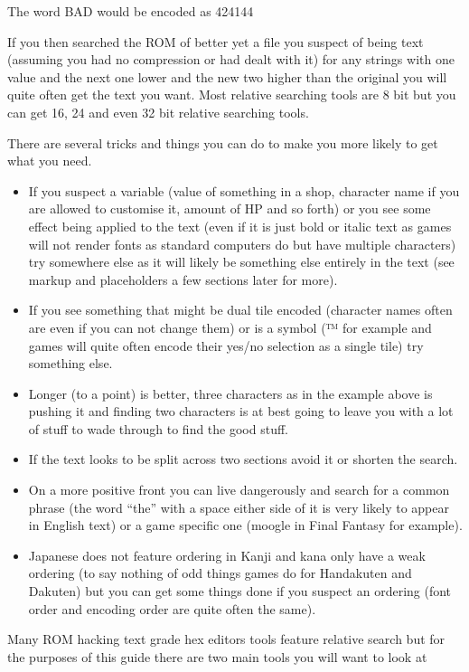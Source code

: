 \documentclass[
]{book}
\providecommand{\tightlist}{%
  \setlength{\itemsep}{0pt}\setlength{\parskip}{0pt}}
\begin{document}
The word BAD would be encoded as 424144

If you then searched the ROM of better yet a file you suspect of being text (assuming you had no compression or had dealt with it) for any strings with one value and the next one lower and the new two higher than the original you will quite often get the text you want. Most relative searching tools are 8 bit but you can get 16, 24 and even 32 bit relative searching tools.

There are several tricks and things you can do to make you more likely to get what you need.

\begin{itemize}
\tightlist
\item
  If you suspect a variable (value of something in a shop, character name if you are allowed to customise it, amount of HP and so forth) or you see some effect being applied to the text (even if it is just bold or italic text as games will not render fonts as standard computers do but have multiple characters) try somewhere else as it will likely be something else entirely in the text (see markup and placeholders a few sections later for more).
\item
  If you see something that might be dual tile encoded (character names often are even if you can not change them) or is a symbol (™ for example and games will quite often encode their yes/no selection as a single tile) try something else.
\item
  Longer (to a point) is better, three characters as in the example above is pushing it and finding two characters is at best going to leave you with a lot of stuff to wade through to find the good stuff.
\item
  If the text looks to be split across two sections avoid it or shorten the search.
\item
  On a more positive front you can live dangerously and search for a common phrase (the word ``the'' with a space either side of it is very likely to appear in English text) or a game specific one (moogle in Final Fantasy for example).
\item
  Japanese does not feature ordering in Kanji and kana only have a weak ordering (to say nothing of odd things games do for Handakuten and Dakuten) but you can get some things done if you suspect an ordering (font order and encoding order are quite often the same).
\end{itemize}

Many ROM hacking text grade hex editors tools feature relative search but for the purposes of this guide there are two main tools you will want to look at
\end{document}
